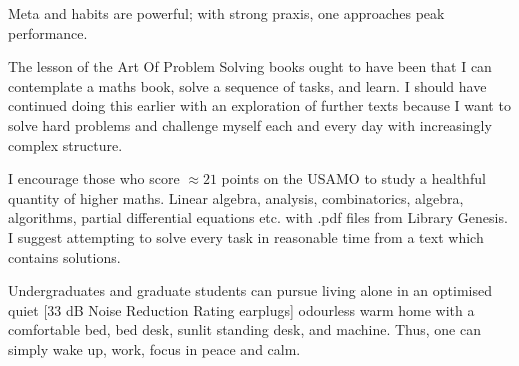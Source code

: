 Meta and habits are powerful; with strong praxis, one approaches peak performance.

The lesson of the Art Of Problem Solving books ought to have been that I can contemplate a maths book, solve a sequence of tasks, and learn. I should have continued doing this earlier with an exploration of further texts because I want to solve hard problems and challenge myself each and every day with increasingly complex structure.

I encourage those who score $\approx 21$ points on the USAMO to study a healthful quantity of higher maths. Linear algebra, analysis, combinatorics, algebra, algorithms, partial differential equations etc. with .pdf files from Library Genesis. I suggest attempting to solve every task in reasonable time from a text which contains solutions.

Undergraduates and graduate students can pursue living alone in an optimised quiet [$33$ dB Noise Reduction Rating earplugs] odourless warm home with a comfortable bed, bed desk, sunlit standing desk, and machine. Thus, one can simply wake up, work, focus in peace and calm.